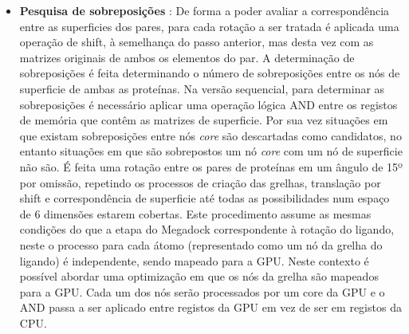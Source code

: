 \begin{itemize}
\item{\textbf{Pesquisa de sobreposições}} : De forma a poder avaliar a correspondência entre as superficies dos pares, para cada rotação a ser tratada é aplicada uma operação de shift, à semelhança do passo anterior, mas desta vez com as matrizes originais de ambos os elementos do par. A determinação de sobreposições é feita determinando o número de sobreposições entre os nós de superficie de ambas as proteínas. Na versão sequencial, para determinar as sobreposições é necessário aplicar uma operação lógica AND entre os registos de memória que contêm as matrizes de superficie. Por sua vez situações em que existam sobreposições entre nós \textit{core} são descartadas como candidatos, no entanto situações em que são sobrepostos um nó \textit{core} com um nó de superficie não são. É feita uma rotação entre os pares de proteínas em um ângulo de 15º por omissão, repetindo os processos de criação das grelhas, translação por shift e correspondência de superficie até todas as possibilidades num espaço de 6 dimensões estarem cobertas. Este procedimento assume as mesmas condições do que a etapa do Megadock correspondente à rotação do ligando, neste o processo para cada átomo (representado como um nó da grelha do ligando) é independente, sendo mapeado para a GPU. Neste contexto é possível abordar uma optimização em que os nós da grelha são mapeados para a GPU. Cada um dos nós serão processados por um core da GPU e o AND passa a ser aplicado entre registos da GPU em vez de ser em registos da CPU.

\end{itemize}
